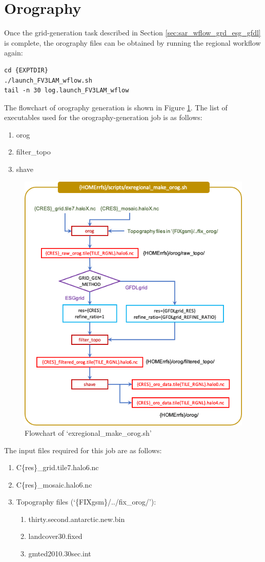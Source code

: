 \documentclass[11pt,fleqn]{report}              %
\begin{document}
\section{Orography}
\label{sec:sar_wflow_oro}

Once the grid-generation task described in Section \ref{sec:sar_wflow_grd_esg_gfdl} is complete, the orography files can be obtained by running the regional workflow again: 

\lstset{language=bash}   
\begin{lstlisting}[frame=trBL]
cd {EXPTDIR}
./launch_FV3LAM_wflow.sh
tail -n 30 log.launch_FV3LAM_wflow
\end{lstlisting}

\vspace{0.3cm}

The flowchart of orography generation is shown in Figure \ref{fig:wflow_make_orog}. The list of executables used for the orography-generation job is as follows:
\begin{enumerate}
\item orog
\item filter\_topo
\item shave
\end{enumerate}


\begin{figure}[ht!]
  \centering
  \includegraphics[width=0.6\linewidth]{FV3LAM_wflow_make_orog.png}
  \caption{Flowchart of `exregional\_make\_orog.sh' }
  \label{fig:wflow_make_orog}
\end{figure}


The input files required for this job are as follows:
\begin{enumerate}
\item C\{res\}\_grid.tile7.halo6.nc
\item C\{res\}\_mosaic.halo6.nc
\item Topography files (`\{FIXgsm\}/../fix\_orog/'):
\begin{enumerate}
\item thirty.second.antarctic.new.bin
\item landcover30.fixed
\item gmted2010.30sec.int
\end{enumerate}
\end{enumerate}
\end{document}
